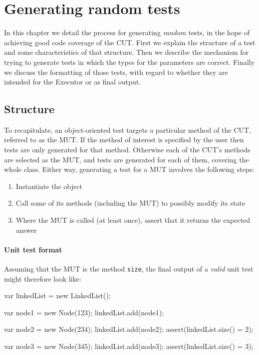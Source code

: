 \chapter{Generating random tests}
\label{randomtest}
In this chapter we detail the process for generating \emph{random} tests, in the hope of achieving good code coverage of the CUT. First we explain the structure of a test and some characteristics of that structure. Then we describe the mechanism for trying to generate tests in which the types for the parameters are correct. Finally we discuss the formatting of those tests, with regard to whether they are intended for the \textsf{Executor} or as final output.

\section{Structure}

To recapitulate, an object-oriented test targets a particular method of the CUT, referred to as the MUT. If the method of interest is specified by the user then tests are only generated for that method. Otherwise each of the CUT's methods are selected as the MUT, and tests are generated for each of them, covering the whole class. Either way, generating a test for a MUT involves the following steps:

\begin{enumerate}
	\item Instantiate the object
	\item Call some of its methods (including the MUT) to possibly modify its state
	\item Where the MUT is called (at least once), assert that it returns the expected answer
\end{enumerate}

\subsubsection{Unit test format}
Assuming that the MUT is the method \texttt{size}, the final output of a \emph{valid} unit test might therefore look like:

\begin{code}[caption=Unit test format,label=final]
var linkedList = new LinkedList();

var node1 = new Node(123);
linkedList.add(node1);

var node2 = new Node(234);
linkedList.add(node2);
assert(linkedList.size() = 2);

var node3 = new Node(345);
linkedList.add(node3);
assert(linkedList.size() = 3);
\end{code}

